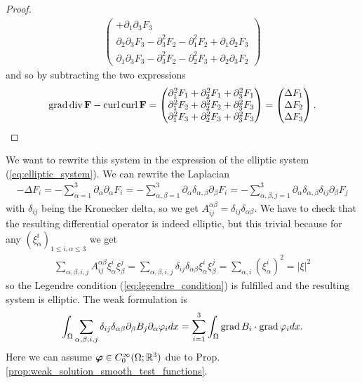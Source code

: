 \documentclass[../master_thesis.tex]{subfiles}
\begin{document}
\begin{proof}
\begin{align*}
\begin{pmatrix}
            + \partial_1 \partial_3 F_3 
            \\ \partial_2 \partial_3 F_3 - \partial^2_3 F_2 - \partial_1^2 F_2
            + \partial_1 \partial_2 F_3
            \\ \partial_1 \partial_3 F_3 - \partial^2_3 F_2 - \partial_2^2 F_3
            + \partial_2 \partial_3 F_2  
            \end{pmatrix}
    \end{align*}
    and so by subtracting the two expressions
    \begin{align*}
        \operatorname{grad} \operatorname{div} \mathbf{F} - \operatorname{curl} \operatorname{curl} \mathbf{F}  
        = \begin{pmatrix}
            \partial_1^2 F_1 + \partial_2^2 F_1 + \partial_3^2 F_1
            \\ \partial_1^2 F_2 + \partial_2^2 F_2 + \partial_3^2 F_3
            \\ \partial_1^2 F_3 + \partial_2^2 F_3 + \partial_3^2 F_3
        \end{pmatrix}
        = \begin{pmatrix}
            \Delta F_1 \\ \Delta F_2 \\ \Delta F_3
        \end{pmatrix}.
    \end{align*}
\end{proof}
We want to rewrite this system in the expression of the elliptic system 
(\ref{eq:elliptic_system}). We can rewrite the Laplacian
\begin{align*}
    - \Delta F_i = - \sum\limits_{\alpha = 1}^3 
        \partial_\alpha \partial_\alpha F_i
    = - \sum\limits_{\alpha,\beta = 1}^3 
    \partial_\alpha \delta_{\alpha,\beta} \partial_\beta F_i
    = - \sum\limits_{\alpha,\beta,j = 1}^3 
    \partial_\alpha \delta_{\alpha,\beta} \delta_{ij} \partial_\beta F_j
\end{align*}
with $\delta_{ij}$ being the Kronecker delta, 
so we get $A_{ij}^{\alpha\beta} = \delta_{ij} \delta_{\alpha \beta}$.
We have to check that the resulting differential operator is indeed
elliptic, but this trivial because for any 
$(\xi_\alpha^i)_{1\leq i,\alpha \leq 3}$
we get 
\begin{align*}
    \sum\limits_{\alpha,\beta,i,j} A_{ij}^{\alpha\beta} \xi_\alpha^i \xi_\beta^j 
    = \sum\limits_{\alpha,\beta,i,j} \delta_{ij} \delta_{\alpha \beta} 
        \xi_\alpha^i \xi_\beta^j 
    = \sum\limits_{\alpha,i} (\xi_\alpha^i)^2 = |\xi|^2
\end{align*}
so  the Legendre condition (\ref{eq:legendre_condition}) 
is fulfilled and the resulting system is elliptic. The weak formulation 
is 
\begin{align*}
    \int_\Omega \sum\limits_{\alpha,\beta,i,j} \delta_{ij} \delta_{\alpha\beta}
        \partial_\beta B_j \partial_\alpha \varphi_i dx 
    = \sum\limits_{i=1}^3 \int_\Omega \operatorname{grad} B_i \cdot \operatorname{grad} \varphi_i dx.
\end{align*}
Here we can assume $\bm{\varphi} \in C_0^\infty (\Omega;\mathbb{R}^3)$
due to Prop.\,\ref{prop:weak_solution_smooth_test_functions}.
\end{document}
